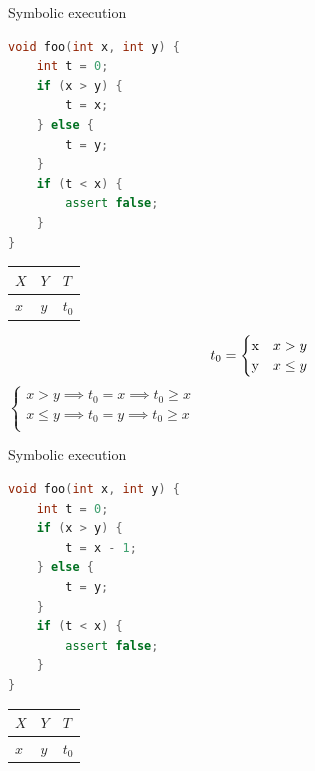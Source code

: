 \documentclass{beamer}
\begin{document}
\begin{frame}[fragile]{Symbolic execution}
\begin{minipage}{0.49\textwidth}
\begin{lstlisting}[language=C++]
void foo(int x, int y) {
    int t = 0;
    if (x > y) {
        t = x;
    } else {
        t = y;
    }
    if (t < x) {
        assert false;
    }
}
\end{lstlisting}
\end{minipage}
\hfill
\begin{minipage}{0.49\textwidth}
\begin{center}
\begin{tabular}{ | l | l | l | }
\hline
$X$ & $Y$ & $T$ \\
\hline
$x$ & $y$ & $t_0$ \\
\hline
\end{tabular}
\begin{equation*}
t_0 =
    \begin{cases}
    $x$ &\text{$x > y$}\\
    $y$ &\text{$x \le y$}
    \end{cases}
\end{equation*}
$\left\{
\begin{array}{l}
x > y \implies t_0 = x \implies t_0 \ge x \\
x \le y \implies t_0 = y \implies t_0 \ge x \\
\end{array}
\right.$
\end{center}
\end{minipage}
\end{frame}

\begin{frame}[fragile]{Symbolic execution}
\begin{minipage}{0.49\textwidth}
\begin{lstlisting}[language=C++]
void foo(int x, int y) {
    int t = 0;
    if (x > y) {
        t = x - 1;
    } else {
        t = y;
    }
    if (t < x) {
        assert false;
    }
}
\end{lstlisting}
\end{minipage}
\hfill
\begin{minipage}{0.49\textwidth}
\begin{center}
\begin{tabular}{ | l | l | l | }
\hline
$X$ & $Y$ & $T$ \\
\hline
$x$ & $y$ & $t_0$ \\
\hline
\end{tabular}
\end{center}
\end{minipage}
\end{frame}
\end{document}
